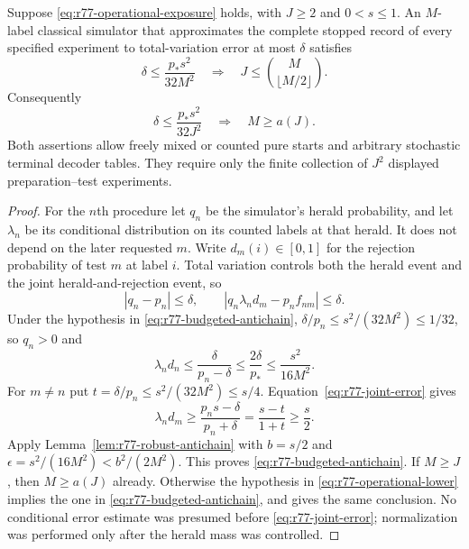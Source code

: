 \begin{theorem}
\label{thm:r77-operational-antichain}
Suppose \eqref{eq:r77-operational-exposure} holds, with $J\ge2$ and
$0<s\le1$.  An $M$-label classical simulator that approximates the
complete stopped record of every specified experiment to total-variation
error at most $\delta$ satisfies
\begin{equation}\label{eq:r77-budgeted-antichain}
 \delta\le\frac{p_*s^2}{32M^2}
 \quad\Longrightarrow\quad
 J\le\binom{M}{\lfloor M/2\rfloor}.
\end{equation}
Consequently
\begin{equation}\label{eq:r77-operational-lower}
 \delta\le\frac{p_*s^2}{32J^2}
 \quad\Longrightarrow\quad M\ge a(J).
\end{equation}
Both assertions allow freely mixed or counted pure starts and arbitrary
stochastic terminal decoder tables.  They require only the finite
collection of $J^2$ displayed preparation--test experiments.
\end{theorem}
\begin{proof}
For the $n$th procedure let $q_n$ be the simulator's herald probability,
and let $\lambda_n$ be its conditional distribution on its counted
labels at that herald.  It does not depend on the later requested $m$.
Write $d_m(i)\in[0,1]$ for the rejection probability of test $m$ at
label $i$.  Total variation controls both the herald event and the
joint herald-and-rejection event, so
\begin{equation}\label{eq:r77-joint-error}
 |q_n-p_n|\le\delta,\qquad
 |q_n\lambda_nd_m-p_nf_{nm}|\le\delta.
\end{equation}
Under the hypothesis in \eqref{eq:r77-budgeted-antichain},
$\delta/p_n\le s^2/(32M^2)\le1/32$, so $q_n>0$ and
\[
 \lambda_nd_n\le\frac{\delta}{p_n-\delta}
                 \le\frac{2\delta}{p_*}
                 \le\frac{s^2}{16M^2}.
\]
For $m\ne n$ put $t=\delta/p_n\le s^2/(32M^2)\le s/4$.
Equation~\eqref{eq:r77-joint-error} gives
\[
 \lambda_nd_m\ge\frac{p_ns-\delta}{p_n+\delta}
                =\frac{s-t}{1+t}\ge\frac{s}{2}.
\]
Apply Lemma~\ref{lem:r77-robust-antichain} with $b=s/2$ and
$\epsilon=s^2/(16M^2)<b^2/(2M^2)$.  This proves
\eqref{eq:r77-budgeted-antichain}.  If $M\ge J$, then $M\ge a(J)$
already.  Otherwise the hypothesis in \eqref{eq:r77-operational-lower}
implies the one in \eqref{eq:r77-budgeted-antichain}, and gives the
same conclusion.  No conditional error estimate was presumed before
\eqref{eq:r77-joint-error}; normalization was performed only after
the herald mass was controlled.
\end{proof}

